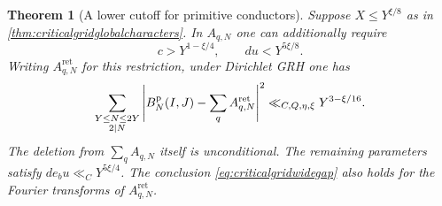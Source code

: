 \documentclass[11pt,a4paper]{article}
\numberwithin{equation}{section}
\newtheorem{theorem}{Theorem}[section]
\begin{document}
\begin{theorem}[A lower cutoff for primitive conductors]
\label{thm:criticalgridprimitiveconductors}
Suppose $X\le Y^{\xi/8}$ as in
\cref{thm:criticalgridglobalcharacters}.
In $A_{q,N}$ one can additionally require
\begin{equation}
     c>Y^{1-\xi/4},\qquad d u<Y^{5\xi/8}.
     \label{eq:criticalgridprimitivecut}
\end{equation}
Writing $A_{q,N}^{\mathrm{ret}}$ for this restriction, under
Dirichlet GRH one has
\begin{equation}
 \sum_{\substack{Y\le N\le 2Y\\2\mid N}}
       \left|B_N^{\rm p}(I,J)-\sum_q A_{q,N}^{\mathrm{ret}}\right|^2
       \ll_{C,Q,\eta,\xi}Y^{3-\xi/16}.
 \label{eq:criticalgridprimitiveconductors}
\end{equation}
The deletion from $\sum_q A_{q,N}$ itself is unconditional.
The remaining parameters satisfy $d e_b u\ll_C Y^{5\xi/4}$.
The conclusion \cref{eq:criticalgridwidegap} also holds for
the Fourier transforms of $A_{q,N}^{\mathrm{ret}}$.
\end{theorem}
\end{document}
